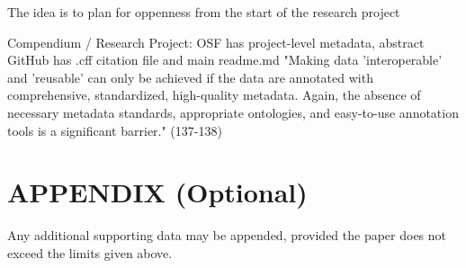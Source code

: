 \documentclass{isprs} %
\begin{document}
The idea is to plan for oppenness from the start of the research project

Compendium / Research Project:
OSF has project-level metadata, abstract
GitHub has .cff citation file and main readme.md
"Making data 'interoperable' and 'reusable' can only be achieved if the data are annotated with comprehensive, standardized, high-quality metadata. Again, the absence of necessary metadata standards, appropriate ontologies, and easy-to-use annotation tools is a significant barrier." (137-138)






\section*{APPENDIX (Optional)}\label{APPENDIX}

Any additional supporting data may be appended, provided the paper does not exceed the limits given above. 
\end{document}
